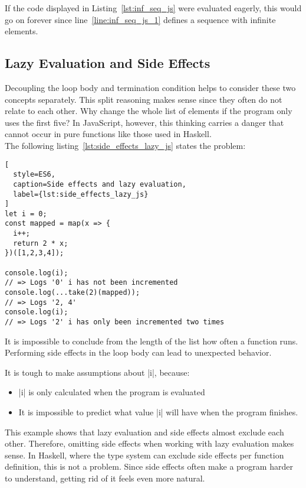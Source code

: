 If the code displayed in Listing~\ref{lst:inf_seq_js} were evaluated eagerly,
this would go on forever since line~\ref{line:inf_seq_js_1} defines a sequence
with infinite elements. \\ 

\subsection{Lazy Evaluation and Side Effects} %
\label{sub:Lazy Evaluation and Side Effects}
Decoupling the loop body and termination condition helps to consider these two
concepts separately. This split reasoning makes sense since they often do not
relate to each other. Why change the whole list of elements if the program only
uses the first five? In JavaScript, however, this thinking carries a danger
that cannot occur in pure functions like those used in Haskell. \\ 
The following listing~\ref{lst:side_effects_lazy_js} states the problem:

\begin{lstlisting}[
  style=ES6,
  caption=Side effects and lazy evaluation,
  label={lst:side_effects_lazy_js}
]
let i = 0;
const mapped = map(x => {
  i++;
  return 2 * x;
})([1,2,3,4]);

console.log(i);
// => Logs '0' i has not been incremented
console.log(...take(2)(mapped));
// => Logs '2, 4' 
console.log(i);
// => Logs '2' i has only been incremented two times
\end{lstlisting}

It is impossible to conclude from the length of the list how often a function
runs. Performing side effects in the loop body can lead to unexpected behavior. 

It is tough to make assumptions about |i|, because:
\begin{itemize}
  \item |i| is only calculated when the program is evaluated
  \item It is impossible to predict what value |i| will have when the program
    finishes.
\end{itemize}
This example shows that lazy evaluation and side effects almost exclude each
other. Therefore, omitting side effects when working with lazy evaluation makes
sense. In Haskell, where the type system can exclude side effects per function
definition, this is not a problem. Since side effects often make a program
harder to understand, getting rid of it feels even more natural.

